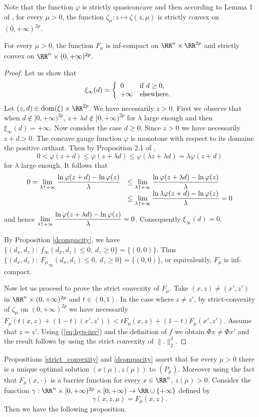 Note that the function $\varphi$ is strictly quasiconcave and then according to Lemma 1 of \cite{barbara2015strict}, for every $\mu>0$, the function $\zeta_\mu:z\mapsto\zeta(z,\mu)$ is strictly convex on $(0,+\infty)^{2p}$. 
\begin{proposition}\label{strict_convexity}
For every $\mu>0$, the function $F_{\mu}$ is inf-compact on $\RR^n\times\RR^{2p}$ and strictly convex on $\RR^n\times(0,+\infty)^{2p}$.
\end{proposition}
\begin{proof} Let us show that  
\begin{eqnarray}\label{xiinfty}
\xi_\infty(d)=\left\{\begin{array}{ll}0&\mbox{if }d\geq0,\cr+\infty&\mbox{elsewhere.}\end{array}
\right.\end{eqnarray}
Let $(z,d)\in \dom(\xi)\times\RR^{2p}$. We have necessarily $z>0$. First we observe that when $d\not\in[0,+\infty)^{2p}$, $z+\lambda d\not\in[0,+\infty)^{2p}$ for $\lambda$ large enough and then $\xi_\infty(d)=+\infty$. Now consider the case $d\geq0$. Since $z>0$ we have necessarily $z+d>0$. The concave gauge function $\varphi$ is monotone with respect to its domaine the positive orthant. Then by Proposition 2.1 of \cite{barbara_crouzeix},
$$0<\varphi(z+d)\leq\varphi(z+\lambda d)\leq\varphi(\lambda z+\lambda d)=\lambda\varphi(z+d)$$
for $\lambda$ large enough. It follows that
$$\begin{array}{ll}
0=\lim\limits_{\lambda\uparrow+\infty}\displaystyle{\ln\varphi(z+d)-\ln\varphi(z)\over\lambda}&\leq\lim\limits_{\lambda\uparrow+ \infty}\displaystyle{\ln\varphi(z+\lambda d)-\ln\varphi(z)\over\lambda}\cr&\leq\lim\limits_{\lambda\uparrow+\infty} \displaystyle{\ln\lambda\varphi(z+d)-\ln\varphi(z)\over\lambda}=0\end{array}$$ and hence $\lim\limits_{\lambda\uparrow+ \infty}\displaystyle{\ln\varphi(z+\lambda d)-\ln\varphi(z)\over\lambda}=0$. Consequently $\xi_\infty(d)=0$.

By Proposition \ref{dcompacity}, we have $\{(d_x,d_z):\ f_\infty(d_x,d_z)\leq0,\ d_z\geq0\}=\{(0,0)\}$. Thus
$\{(d_x,d_z):\ {F_\mu}_\infty(d_x,d_z)\leq0,\ d_z\geq0\}=\{(0,0)\}$, or equivalently, $F_\mu$ is inf-compact. 

Now let us proceed to prove the strict convexity of $F_\mu$.  Take  $(x,z)\not=(x',z')$ in $\RR^n\times(0,+\infty)^{2p}$ and $t\in(0,1)$. In the case where $z\not= z'$, by strict-convexity of $\zeta_\mu$ on $(0,+\infty)^{2p}$ we have necessarily $F_\mu(t(x,z)+(1-t)(x',z'))<tF_\mu(x,z)+(1-t)F_\mu(x',z').$ Assume that $z=z'$. Using (\ref{eq:hyp-inv}) and the definition of $f$ we obtain $\Phi x\not=\Phi x'$ and the result follows by using the strict convexity of $\|.\|_2^2$.
\end{proof}
Propositions \ref{strict_convexity} and \ref{dcompacity} assert that for every $\mu>0$ there is a unique optimal solution  $(x(\mu),z(\mu))$ to $(P_\mu)$. Moreover using the fact that $F_\mu(x,\cdot)$ is a barrier function for every $x\in\RR^n$, $z(\mu)>0$. Consider the function $\gamma:\RR^n\times[0,+\infty)^{2p}\times[0,+\infty)\to \RR\cup\{+\infty\}$ defined by
$$\gamma(x,z,\mu)=F_{\mu}(x,z).$$
Then we have the following proposition.

